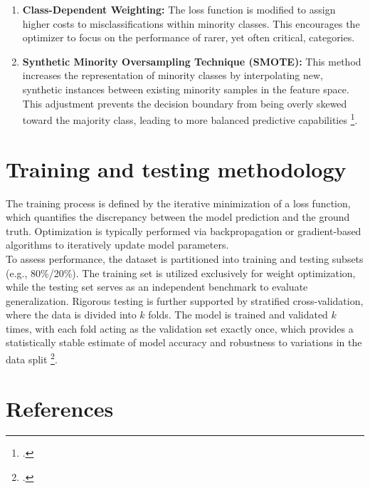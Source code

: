 \begin{refsection}
\begin{enumerate}
    \item \textbf{Class-Dependent Weighting:} The loss function is modified to assign higher costs to misclassifications within minority classes. This encourages the optimizer to focus on the performance of rarer, yet often critical, categories.
    \item \textbf{Synthetic Minority Oversampling Technique (SMOTE):} This method increases the representation of minority classes by interpolating new, synthetic instances between existing minority samples in the feature space. This adjustment prevents the decision boundary from being overly skewed toward the majority class, leading to more balanced predictive capabilities \footcite{hollmann_accurate_2025}.
\end{enumerate}

\section{Training and testing methodology}

The training process is defined by the iterative minimization of a loss function, which quantifies the discrepancy between the model prediction and the ground truth. Optimization is typically performed via backpropagation or gradient-based algorithms to iteratively update model parameters.\\
To assess performance, the dataset is partitioned into training and testing subsets (e.g., 80\%/20\%). The training set is utilized exclusively for weight optimization, while the testing set serves as an independent benchmark to evaluate generalization. Rigorous testing is further supported by stratified cross-validation, where the data is divided into $k$ folds. The model is trained and validated $k$ times, with each fold acting as the validation set exactly once, which provides a statistically stable estimate of model accuracy and robustness to variations in the data split \footcite{parmar_review_2019}.

\newpage 

\renewcommand{\sectionnametext}{References}
\renewcommand{\headingtextR}{\thesection. \sectionnametext}
\section{\sectionnametext}

\printbibliography[heading=none]
\end{refsection}
